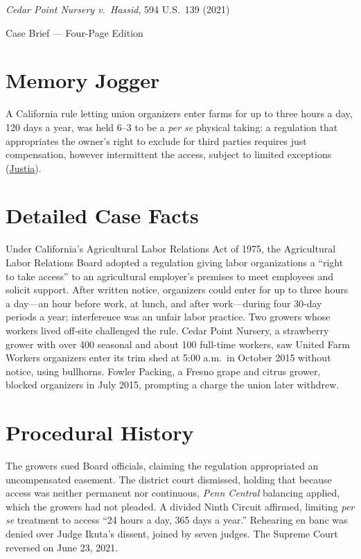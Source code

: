 \documentclass[12pt]{article}
\begin{document}
\begin{center}
{\LARGE \textit{Cedar Point Nursery v.\ Hassid}, 594 U.S.\ 139 (2021)\par}
\vspace{0.8em}
{\large Case Brief --- Four-Page Edition\par}
\end{center}
\vspace{1em}

\section{Memory Jogger}

A California rule letting union organizers enter farms for up to three hours a day, 120 days a year, was held 6--3 to be a \emph{per se} physical taking: a regulation that appropriates the owner's right to exclude for third parties requires just compensation, however intermittent the access, subject to limited exceptions (\href{https://supreme.justia.com/cases/federal/us/594/20-107/}{Justia}).

\section{Detailed Case Facts}

Under California's Agricultural Labor Relations Act of 1975, the Agricultural Labor Relations Board adopted a regulation giving labor organizations a ``right to take access'' to an agricultural employer's premises to meet employees and solicit support. After written notice, organizers could enter for up to three hours a day---an hour before work, at lunch, and after work---during four 30-day periods a year; interference was an unfair labor practice. Two growers whose workers lived off-site challenged the rule. Cedar Point Nursery, a strawberry grower with over 400 seasonal and about 100 full-time workers, saw United Farm Workers organizers enter its trim shed at 5:00 a.m.\ in October 2015 without notice, using bullhorns. Fowler Packing, a Fresno grape and citrus grower, blocked organizers in July 2015, prompting a charge the union later withdrew.

\section{Procedural History}

The growers sued Board officials, claiming the regulation appropriated an uncompensated easement. The district court dismissed, holding that because access was neither permanent nor continuous, \textit{Penn Central} balancing applied, which the growers had not pleaded. A divided Ninth Circuit affirmed, limiting \emph{per se} treatment to access ``24 hours a day, 365 days a year.'' Rehearing en banc was denied over Judge Ikuta's dissent, joined by seven judges. The Supreme Court reversed on June 23, 2021.
\end{document}
